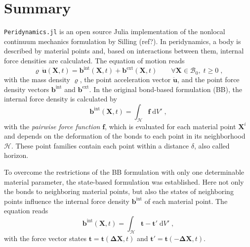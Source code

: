 \documentclass{juliacon}
\newcommand{\vb}{\boldsymbol}
\begin{document}


\maketitle

\section{Summary}

\texttt{Peridynamics.jl} is an open source Julia \cite{bezanson2017julia} implementation of the nonlocal continuum mechanics formulation by Silling (ref?).
In peridynamics, a body is described by material points and, based on interactions between them, internal force densities are calculated. 
The equation of motion reads
\begin{equation}
    \varrho \, \vb{\ddot{u}}(\vb{X},t) = \vb{b}^{\mathrm{int}}(\vb{X},t) + \vb{b}^{\mathrm{ext}}(\vb{X},t) \qquad \forall \vb{X} \in \mathcal{B}_0, \; t \geq 0 \; ,
\end{equation} 
with the mass density $\varrho$, the point acceleration vector $\vb{\ddot{u}}$, and the point force density vectors $\vb{b}^{\mathrm{int}}$ and $\vb{b}^{\mathrm{ext}}$. 
In the original bond-based formulation (BB), the internal force density is calculated by
\begin{equation}
    \vb{b}^{\mathrm{int}}(\vb{X},t) = \int_\mathcal{H} \vb{f} \; \mathrm{d}V' \; ,
\end{equation}
with the \emph{pairwise force function} $\vb{f}$, which is evaluated for each material point $\vb{X}^i$ and depends on the deformation of the bonds to each point in its neighborhood $\mathcal{H}$.
These point families contain each point within a distance $\delta$, also called horizon.

To overcome the restrictions of the BB formulation with only one determinable material parameter, the state-based formulation was established.
Here not only the bonds to neighboring material points, but also the states of neighboring points influence the internal force density $\vb{b}^{\mathrm{int}}$ of each material point.
The equation reads
\begin{equation}
    \vb{b}^{\mathrm{int}} (\vb{X},t) = \int_\mathcal{H} \vb{t} - \vb{t}' \; \mathrm{d}V' \; ,
\end{equation}
with the force vector states $\vb{t}=\vb{t}(\vb{\Delta X}, t)$ and $\vb{t}'=\vb{t}(-\vb{\Delta X}, t)$.
\end{document}
